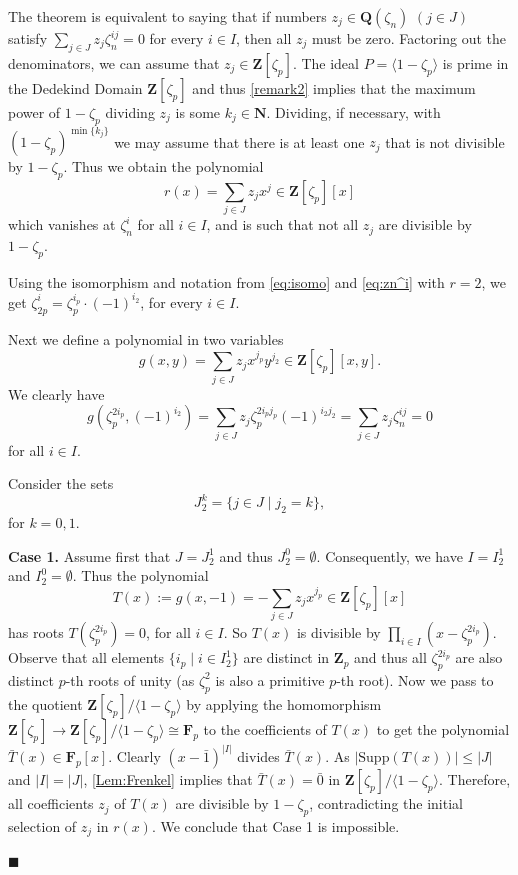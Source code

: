 \documentclass[10pt,a4paper]{amsart}
\newenvironment{proofofA}{{\bf {Proof of Theorem \ref{Thm:A}.} }}{\hfill $\blacksquare$ \\}
\def\Z{\mathbf{Z}}
\def\N{\mathbf{N}}
\def\Q{\mathbf{Q}}
\def\F{\mathbf{F}}
\def\Supp{\mathrm{Supp}}
\begin{document}
\begin{proofofA}
  The theorem is equivalent to saying that if numbers $z_j \in \Q(\zeta_n)$ $(j \in J)$ satisfy $\sum_{j \in J}z_j \zeta_n^{ij}=0$ for every $i \in I$, then all $z_j$ must be zero. Factoring out the  denominators, we can assume that $z_j \in  \Z[\zeta_p]$.  The ideal $P= \langle 1 - \zeta_p \rangle $ is prime in the Dedekind Domain $\Z[\zeta_p]$ and thus \autoref{remark2} implies that
  the maximum power of $1 - \zeta_p$ dividing $z_j $ is some  $k_j\in \N$. Dividing, if necessary, with $(1-\zeta_p)^{\min\{k_j\}}$ we may assume that there is at least one $z_j$ that is not divisible by $ 1 - \zeta_p$.
Thus we obtain the polynomial 
\begin{equation}\label{eq:s(x)}
r(x) = \sum_{j \in J }z_jx^{j}  \in \Z[\zeta_p][x] 
\end{equation}
which vanishes at $\zeta_n^i$ for all $i \in I$, and is such that  not all $z_j$ are divisible by $1-\zeta_p$.

Using the isomorphism and  notation from \eqref{eq:isomo} and \eqref{eq:zn^i} with $r=2$, we get $\zeta_{2p}^i= \zeta_p^{i_p}  \cdot (-1)^{i_2}$, 
for every $i \in I$.

Next we define a polynomial in two variables 
\begin{equation}\label{eq:g(x)}
g(x,y) = \sum_{j \in J }z_jx^{j_p}y^{j_2}  \in \Z[\zeta_p][x,y]. 
\end{equation}
We clearly have 
\begin{equation}\label{eq:rootsOfg(x)}
g(\zeta_p^{2i_p}, (-1)^{i_2}) = \sum_{j \in J }z_j \zeta_p^{2i_pj_p} (-1)^{i_2j_2} = \sum_{j \in J }z_j \zeta_n^{ij}= 0 
\end{equation}
for all $i \in I$.

Consider the sets 
\begin{equation}\label{eq:I^k}
  J_2^k = \{ j \in J \mid j_2 = k  \},    
\end{equation}
for $k=0,1$.

{\bf Case 1. } Assume first that $J = J_2^1$ and thus $J_2^0 = \emptyset$. Consequently, we have $I = I_2^1$ and $I_2^0 = \emptyset$. Thus  the polynomial 
\[
T(x):= g(x,-1) = - \sum_{j \in J }z_jx^{j_p}  \in \Z[\zeta_p][x]
\]
has  roots 
$T(\zeta_p^{2i_p})=0$,  for all $i \in I$. So $T(x)$ is divisible by $\prod_{i \in I}(x- \zeta_p^{2i_p})$. Observe that all elements $\{ i_p \mid i \in I_2^1\}$  are distinct in $\Z_p$ and thus all $\zeta_p^{2i_p}$ are also distinct $p$-th roots of unity (as $\zeta_p^2$ is also a primitive $p$-th root).
Now we pass to the quotient $\Z[\zeta_p] /\langle 1 - \zeta_p \rangle $ by applying the homomorphism $\Z[\zeta_p] \to \Z[\zeta_p]/\langle 1 - \zeta_p \rangle \cong  \F_p $  to the coefficients of $T(x)$ to get the polynomial  $\bar{T}(x) \in \F_p[x]$. Clearly $(x- \bar{1})^{|I|}$ divides $\bar{T}(x)$. As 
 $|\Supp(T(x))| \leq |J|$  and $|I|=|J|$, \autoref{Lem:Frenkel} implies that $\bar{T}(x) =  \bar{0}$ in $ \Z[\zeta_p]/\langle 1 - \zeta_p \rangle $. Therefore, all coefficients $z_j$ of $T(x)$ are divisible by $1-\zeta_p$, contradicting the initial selection of $z_j$ in $r(x)$. We conclude that Case 1 is impossible.
 

\end{proofofA}
\end{document}
